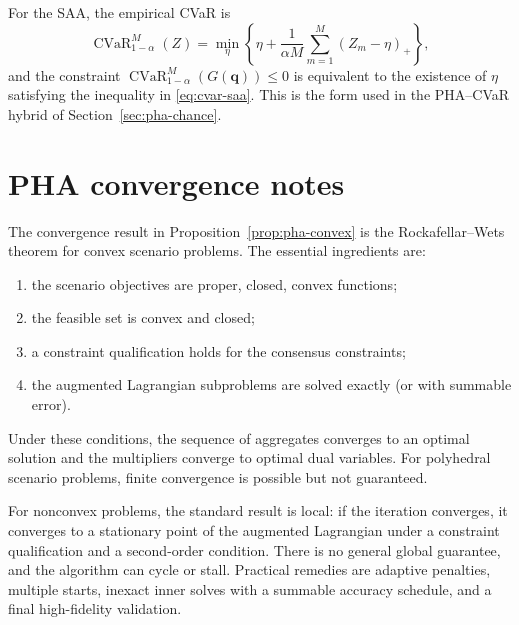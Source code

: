 \documentclass[11pt]{article}
\numberwithin{equation}{section}
\newcommand{\qq}{\mathbf{q}}
\newcommand{\CVaR}{\operatorname{CVaR}}
\theoremstyle{plain}
\begin{document}
For the SAA, the empirical CVaR is
\begin{equation}
\label{eq:app-cvar-saa}
\CVaR_{1-\alpha}^M(Z)
=\min_{\eta}\left\{
\eta+\frac{1}{\alpha M}\sum_{m=1}^{M}(Z_m-\eta)_+
\right\},
\end{equation}
and the constraint $\CVaR_{1-\alpha}^M(G(\qq))\le0$ is equivalent to the
existence of $\eta$ satisfying the inequality in \eqref{eq:cvar-saa}.  This is
the form used in the PHA--CVaR hybrid of Section~\ref{sec:pha-chance}.

\section{PHA convergence notes}
\label{app:convergence}

The convergence result in Proposition~\ref{prop:pha-convex} is the
Rockafellar--Wets theorem for convex scenario problems.  The essential
ingredients are:
\begin{enumerate}[leftmargin=1.6em,itemsep=2pt]
  \item the scenario objectives are proper, closed, convex functions;
  \item the feasible set is convex and closed;
  \item a constraint qualification holds for the consensus constraints;
  \item the augmented Lagrangian subproblems are solved exactly (or with
        summable error).
\end{enumerate}
Under these conditions, the sequence of aggregates converges to an optimal
solution and the multipliers converge to optimal dual variables.  For
polyhedral scenario problems, finite convergence is possible but not
guaranteed.

For nonconvex problems, the standard result is local: if the iteration
converges, it converges to a stationary point of the augmented Lagrangian
under a constraint qualification and a second-order condition.  There is no
general global guarantee, and the algorithm can cycle or stall.  Practical
remedies are adaptive penalties, multiple starts, inexact inner solves with a
summable accuracy schedule, and a final high-fidelity validation.
\end{document}
